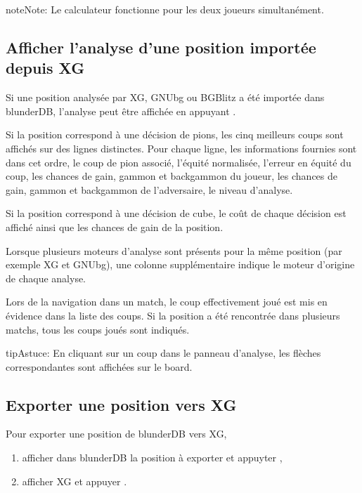 \documentclass[letterpaper,10pt,french]{sphinxmanual}
\begin{document}
\begin{sphinxadmonition}{note}{Note:}
\sphinxAtStartPar
Le calculateur fonctionne pour les deux joueurs simultanément.
\end{sphinxadmonition}


\subsection{Afficher l’analyse d’une position importée depuis XG}
\label{\detokenize{guide_utilisateur:afficher-l-analyse-d-une-position-importee-depuis-xg}}
\sphinxAtStartPar
Si une position analysée par XG, GNUbg ou BGBlitz a été importée dans
blunderDB, l’analyse peut être affichée en appuyant .

\sphinxAtStartPar
Si la position correspond à une décision de pions, les cinq meilleurs coups
sont affichés sur des lignes distinctes. Pour chaque ligne, les informations
fournies sont dans cet ordre, le coup de pion associé, l’équité normalisée,
l’erreur en équité du coup, les chances de gain, gammon et backgammon du
joueur, les chances de gain, gammon et backgammon de l’adversaire, le niveau
d’analyse.

\sphinxAtStartPar
Si la position correspond à une décision de cube, le coût de chaque décision
est affiché ainsi que les chances de gain de la position.

\sphinxAtStartPar
Lorsque plusieurs moteurs d’analyse sont présents pour la même position
(par exemple XG et GNUbg), une colonne supplémentaire indique le moteur
d’origine de chaque analyse.

\sphinxAtStartPar
Lors de la navigation dans un match, le coup effectivement joué est mis en évidence dans la liste
des coups. Si la position a été rencontrée dans plusieurs
matchs, tous les coups joués sont indiqués.

\begin{sphinxadmonition}{tip}{Astuce:}
\sphinxAtStartPar
En cliquant sur un coup dans le panneau d’analyse, les flèches
correspondantes sont affichées sur le board.
\end{sphinxadmonition}


\subsection{Exporter une position vers XG}
\label{\detokenize{guide_utilisateur:exporter-une-position-vers-xg}}
\sphinxAtStartPar
Pour exporter une position de blunderDB vers XG,
\begin{enumerate}
%
\item {} 
\sphinxAtStartPar
afficher dans blunderDB la position à exporter et appuyter ,

\item {} 
\sphinxAtStartPar
afficher XG et appuyer .

\end{enumerate}
\end{document}
